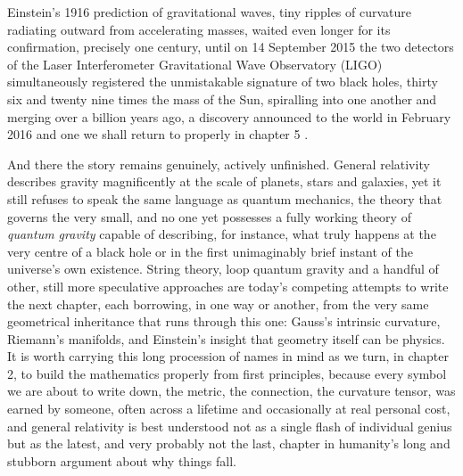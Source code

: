     Einstein's 1916 prediction of gravitational waves, tiny ripples of curvature radiating outward from accelerating masses, waited even longer for its confirmation, precisely one century, until on 14 September 2015 the two detectors of the Laser Interferometer Gravitational Wave Observatory (LIGO) simultaneously registered the unmistakable signature of two black holes, thirty six and twenty nine times the mass of the Sun, spiralling into one another and merging over a billion years ago, a discovery announced to the world in February 2016 and one we shall return to properly in chapter 5 \citep{abbott2016}.

    And there the story remains genuinely, actively unfinished. General relativity describes gravity magnificently at the scale of planets, stars and galaxies, yet it still refuses to speak the same language as quantum mechanics, the theory that governs the very small, and no one yet possesses a fully working theory of \textit{quantum gravity} capable of describing, for instance, what truly happens at the very centre of a black hole or in the first unimaginably brief instant of the universe's own existence. String theory, loop quantum gravity and a handful of other, still more speculative approaches are today's competing attempts to write the next chapter, each borrowing, in one way or another, from the very same geometrical inheritance that runs through this one: Gauss's intrinsic curvature, Riemann's manifolds, and Einstein's insight that geometry itself can be physics. It is worth carrying this long procession of names in mind as we turn, in chapter 2, to build the mathematics properly from first principles, because every symbol we are about to write down, the metric, the connection, the curvature tensor, was earned by someone, often across a lifetime and occasionally at real personal cost, and general relativity is best understood not as a single flash of individual genius but as the latest, and very probably not the last, chapter in humanity's long and stubborn argument about why things fall.
